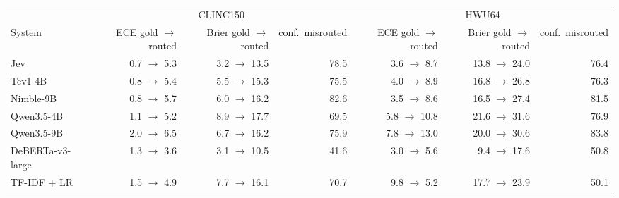 \begin{tabular}{lrrrrrr}
\toprule
 & \multicolumn{3}{c}{CLINC150} & \multicolumn{3}{c}{HWU64} \\
\cmidrule(lr){2-4}\cmidrule(lr){5-7}
System & ECE gold $\to$ routed & Brier gold $\to$ routed & conf.\ misrouted & ECE gold $\to$ routed & Brier gold $\to$ routed & conf.\ misrouted \\
\midrule
Jev & 0.7 $\to$ 5.3 & 3.2 $\to$ 13.5 & 78.5 & 3.6 $\to$ 8.7 & 13.8 $\to$ 24.0 & 76.4 \\
Tev1-4B & 0.8 $\to$ 5.4 & 5.5 $\to$ 15.3 & 75.5 & 4.0 $\to$ 8.9 & 16.8 $\to$ 26.8 & 76.3 \\
Nimble-9B & 0.8 $\to$ 5.7 & 6.0 $\to$ 16.2 & 82.6 & 3.5 $\to$ 8.6 & 16.5 $\to$ 27.4 & 81.5 \\
Qwen3.5-4B & 1.1 $\to$ 5.2 & 8.9 $\to$ 17.7 & 69.5 & 5.8 $\to$ 10.8 & 21.6 $\to$ 31.6 & 76.9 \\
Qwen3.5-9B & 2.0 $\to$ 6.5 & 6.7 $\to$ 16.2 & 75.9 & 7.8 $\to$ 13.0 & 20.0 $\to$ 30.6 & 83.8 \\
DeBERTa-v3-large & 1.3 $\to$ 3.6 & 3.1 $\to$ 10.5 & 41.6 & 3.0 $\to$ 5.6 & 9.4 $\to$ 17.6 & 50.8 \\
TF-IDF + LR & 1.5 $\to$ 4.9 & 7.7 $\to$ 16.1 & 70.7 & 9.8 $\to$ 5.2 & 17.7 $\to$ 23.9 & 50.1 \\
\bottomrule
\end{tabular}
